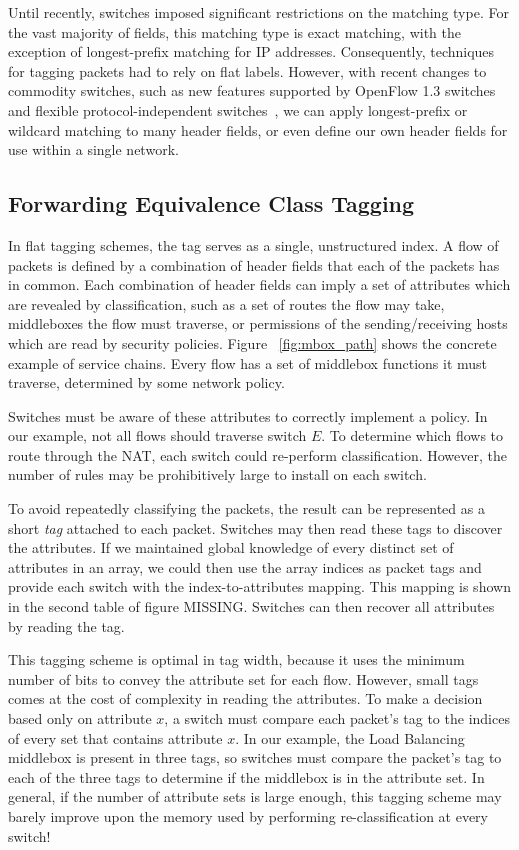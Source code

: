 Until recently, switches imposed significant restrictions on the matching type.
For the vast majority of fields, this matching type is exact matching, with the
exception of longest-prefix matching for IP addresses. Consequently, techniques
for tagging packets had to rely on flat labels.  However, with recent changes to
commodity switches, such as new features supported by OpenFlow 1.3
switches~\cite{of13} and flexible protocol-independent switches~\cite{P4},
we can apply longest-prefix or wildcard matching to many header fields, or
even define our own header fields for use within a single network.

\subsection{Forwarding Equivalence Class Tagging} In flat tagging schemes, the
tag serves as a single, unstructured index.  A flow of packets is defined by a
combination of header fields that each of the packets has in common. Each
combination of header fields can imply a set of attributes which are revealed by
classification, such as a set of routes the flow may take, middleboxes the flow
must traverse, or permissions of the sending/receiving hosts which are read by
security policies.  Figure ~\ref{fig:mbox_path} shows the concrete example of
service chains. Every flow has a set of middlebox functions it must traverse,
determined by some network policy.

Switches must be aware of these attributes to correctly implement a policy. In
our example, not all flows should traverse switch $E$. To determine which flows
to route through the NAT, each switch could re-perform classification. However,
the number of rules may be prohibitively large to install on each switch.  

To avoid repeatedly classifying the packets, the result can be represented as a
short \textit{tag} attached to each packet. Switches may then read these tags to
discover the attributes. If we maintained global knowledge of every distinct set
of attributes in an array, we could then use the array indices as packet tags
and provide each switch with the index-to-attributes mapping. This mapping is
shown in the second table of figure MISSING. Switches can then recover all
attributes by reading the tag.


This tagging scheme is optimal in tag width, because it uses the minimum number
of bits to convey the attribute set for each flow. However, small tags comes at
the cost of complexity in reading the attributes.  To make a decision based only
on attribute $x$, a switch must compare each packet's tag to the indices of
every set that contains attribute $x$. In our example, the Load Balancing
middlebox is present in three tags, so switches must compare the packet's tag to
each of the three tags to determine if the middlebox is in the attribute set. In
general, if the number of attribute sets is large enough, this tagging scheme
may barely improve upon the memory used by performing re-classification at every
switch!

